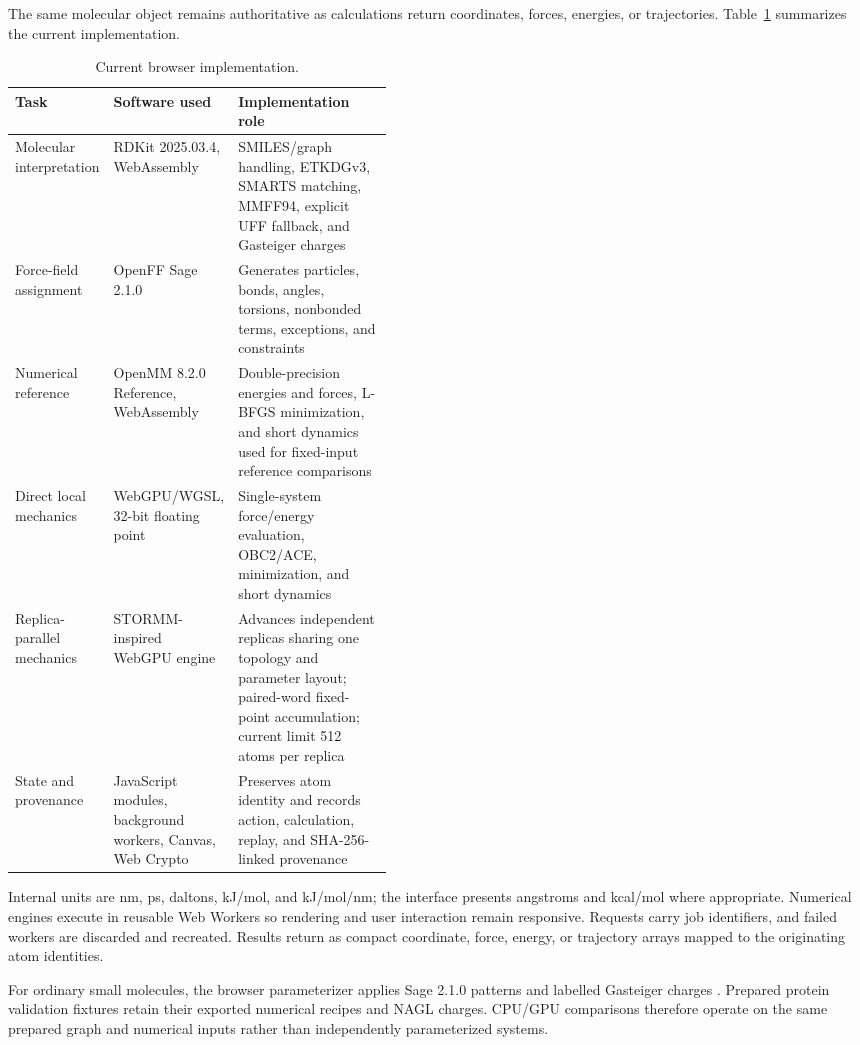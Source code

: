 \documentclass[11pt]{article}
\begin{document}
\begin{small}
The same molecular object remains authoritative as calculations return coordinates, forces, energies, or trajectories. Table~\ref{tab:appA_browser_impl} summarizes the current implementation.

\begin{table}[htbp]
\centering\small
\caption{Current browser implementation.}
\label{tab:appA_browser_impl}
\begin{tabularx}{\linewidth}{@{}p{0.20\linewidth}p{0.24\linewidth}X@{}}
\toprule
\textbf{Task} & \textbf{Software used} & \textbf{Implementation role}\\
\midrule
Molecular interpretation & RDKit 2025.03.4, WebAssembly & SMILES/graph handling, ETKDGv3, SMARTS matching, MMFF94, explicit UFF fallback, and Gasteiger charges\\
Force-field assignment & OpenFF Sage 2.1.0 & Generates particles, bonds, angles, torsions, nonbonded terms, exceptions, and constraints\\
Numerical reference & OpenMM 8.2.0 Reference, WebAssembly & Double-precision energies and forces, L-BFGS minimization, and short dynamics used for fixed-input reference comparisons\\
Direct local mechanics & WebGPU/WGSL, 32-bit floating point & Single-system force/energy evaluation, OBC2/ACE, minimization, and short dynamics\\
Replica-parallel mechanics & STORMM-inspired WebGPU engine & Advances independent replicas sharing one topology and parameter layout; paired-word fixed-point accumulation; current limit 512 atoms per replica\\
State and provenance & JavaScript modules, background workers, Canvas, Web Crypto & Preserves atom identity and records action, calculation, replay, and SHA-256-linked provenance\\
\bottomrule
\end{tabularx}
\end{table}

Internal units are nm, ps, daltons, kJ/mol, and kJ/mol/nm; the interface presents angstroms and kcal/mol where appropriate. Numerical engines execute in reusable Web Workers so rendering and user interaction remain responsive. Requests carry job identifiers, and failed workers are discarded and recreated. Results return as compact coordinate, force, energy, or trajectory arrays mapped to the originating atom identities.

For ordinary small molecules, the browser parameterizer applies Sage 2.1.0 patterns and labelled Gasteiger charges \citep{boothroyd2023sage,gasteiger1980charges}. Prepared protein validation fixtures retain their exported numerical recipes and NAGL charges. CPU/GPU comparisons therefore operate on the same prepared graph and numerical inputs rather than independently parameterized systems.


\end{small}
\end{document}
